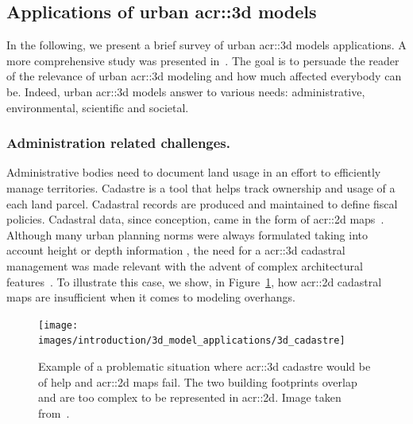     \subsection{Applications of urban \texorpdfstring{\gls*{acr::3d}}{3D} models}
        \label{subsec::introduction::urban_3d_reconstruction::applications}
        In the following, we present a brief survey of  urban \gls{acr::3d} models applications.
        A more comprehensive study was presented in~\parencite{biljecki2015applications}.
        The goal is to persuade the reader of the relevance of urban \gls{acr::3d} modeling and how much affected everybody can be.
        Indeed, urban \gls{acr::3d} models answer to various needs: administrative, environmental, scientific and societal.

        \subsubsection{Administration related challenges.}
            Administrative bodies need to document land usage in an effort to efficiently manage territories.
            Cadastre is a tool that helps track ownership and usage of a each land parcel.
            Cadastral records are produced and maintained to define fiscal policies.
            Cadastral data, since conception, came in the form of \gls{acr::2d} maps~\parencite{billen20033d}.
            Although many urban planning norms were always formulated taking into account height or depth information \parencite{brasebin20183d}, the need for a \gls{acr::3d} cadastral management was made relevant with the advent of complex architectural features~\parencite{biljecki2015applications}.
            To illustrate this case, we show, in Figure~\ref{fig::3d_cadastre_need_example}, how \gls{acr::2d} cadastral maps are insufficient when it comes to modeling overhangs.\\
            \begin{figure}[!htb]
                \centering
                \texttt{[image: images/introduction/3d\_model\_applications/3d\_cadastre]}
                \caption[
                    Example of a problematic situation where \acrshort*{acr::3d} cadastre would be of help and \acrshort*{acr::2d} maps fail.
                ]{
                    \label{fig::3d_cadastre_need_example}
                    Example of a problematic situation where \acrshort*{acr::3d} cadastre would be of help and \acrshort*{acr::2d} maps fail.
                    The two building footprints overlap and are too complex to be represented in \acrshort*{acr::2d}.
                    Image taken from~\parencite{biljecki2015applications}.
                }
            \end{figure}

